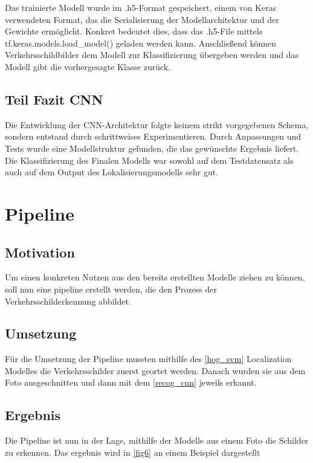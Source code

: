 \documentclass[runningheads]{llncs}
\begin{document}
Das trainierte Modell wurde im .h5-Format gespeichert, einem von Keras verwendeten Format, das die Serialisierung der
Modellarchitektur und der Gewichte ermöglicht. Konkret bedeutet dies, dass das .h5-File mittels tf.keras.models.load\_model()
geladen werden kann. Anschließend können Verkehrsschildbilder dem Modell zur Klassifizierung übergeben werden und das Modell
gibt die vorhergesagte Klasse zurück.

\subsection{Teil Fazit CNN}
Die Entwicklung der CNN-Architektur folgte keinem strikt vorgegebenen Schema, sondern entstand durch schrittweises Experimentieren.
Durch Anpassungen und Tests wurde eine Modellstruktur gefunden, die das gewünschte Ergebnis liefert. Die Klassifizierung des
Finalen Modells war sowohl auf dem Testdatensatz als auch auf dem Output des Lokalisierungsmodells sehr gut.

\section{Pipeline}

\subsection{Motivation}

Um einen konkreten Nutzen aus den bereits erstellten Modelle ziehen zu können, soll nun eine pipeline erstellt werden, die den Prozess der Verkehrsschilderkennung abbildet. 

\subsection{Umsetzung}

Für die Umsetzung der Pipeline mussten mithilfe des \ref{hog_svm} Localization Modelles die Verkehrsschilder zuerst geortet werden. Danach wurden sie aus dem Foto ausgeschnitten und dann mit dem \ref{recog_cnn} jeweils erkannt. 

\subsection{Ergebnis}

Die Pipeline ist nun in der Lage, mithilfe der Modelle aus einem Foto die Schilder zu erkennen. Das ergebnis wird in \ref{fig6} an einem Beispiel dargestellt
\end{document}
